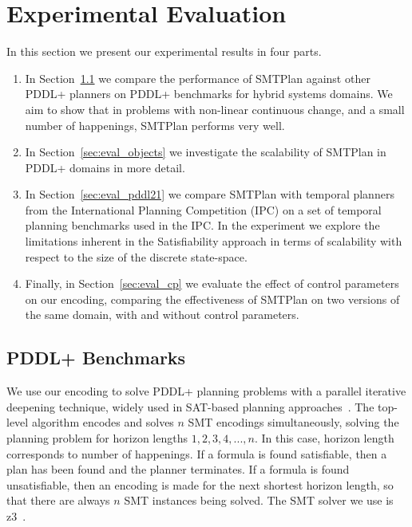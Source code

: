\section{Experimental Evaluation}\label{sec:experiments}

In this section we present our experimental results in four parts.
\begin{enumerate}
    \item In Section~\ref{sec:eval_pddl+} we compare the performance of SMTPlan against other PDDL+ planners on PDDL+ benchmarks for hybrid systems domains. We aim to show that in problems with non-linear continuous change, and a small number of happenings, SMTPlan performs very well.
    
    \item In Section~\ref{sec:eval_objects} we investigate the scalability of SMTPlan in PDDL+ domains in more detail.
    
    \item In Section~\ref{sec:eval_pddl21} we compare SMTPlan with temporal planners from the International Planning Competition (IPC) on a set of temporal planning benchmarks used in the IPC. In the experiment we explore the limitations inherent in the Satisfiability approach in terms of scalability with respect to the size of the discrete state-space.
    
    \item Finally, in Section~\ref{sec:eval_cp} we evaluate the effect of control parameters on our encoding, comparing the effectiveness of SMTPlan on two versions of the same domain, with and without control parameters.
\end{enumerate}

\subsection{PDDL+ Benchmarks}\label{sec:eval_pddl+}

We use our encoding to solve PDDL+ planning problems with a parallel iterative deepening technique, widely used in SAT-based planning approaches~\cite{nab02,rin06}. The top-level algorithm encodes and solves $n$ SMT encodings simultaneously, solving the planning problem for horizon lengths $1,2,3,4,...,n$. In this case, horizon length corresponds to number of happenings. If a formula is found satisfiable, then a plan has been found and the planner terminates. If a formula is found unsatisfiable, then an encoding is made for the next shortest horizon length, so that there are always $n$ SMT instances being solved. The SMT solver we use is z3~\cite{dem08}.

